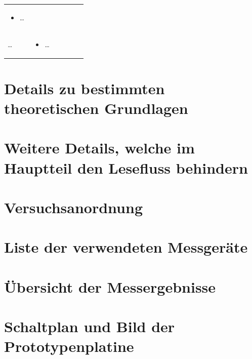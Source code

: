 \documentclass{scrbook} %
\begin{document}
\begin{table}[hbt]
\begin{tabular}{>{\raggedright\arraybackslash}p{0.3\linewidth} >{\raggedright\arraybackslash}p{0.65\linewidth}}
\begin{itemize}[noitemsep,topsep=0pt,partopsep=0pt,parsep=0pt]
                            \item \ldots
                            \end{itemize} \\ 
        \ldots    &    \vspace{-\topsep}
                    \begin{itemize}[noitemsep,topsep=0pt,partopsep=0pt,parsep=0pt] 
                    \item \ldots
                    \end{itemize} \\ 
        \hline 
    \end{tabular} 
\end{table}

\setcounter{chapter}{2}

\section{Details zu bestimmten theoretischen Grundlagen}

\section{Weitere Details, welche im Hauptteil den Lesefluss behindern}

\setcounter{chapter}{3}
\setcounter{section}{0}
\setcounter{table}{0}
\setcounter{figure}{0}

\section{Versuchsanordnung}

\section{Liste der verwendeten Messgeräte}

\section{Übersicht der Messergebnisse}

\section{Schaltplan und Bild der Prototypenplatine}

\setcounter{chapter}{4}
\setcounter{section}{0}
\setcounter{table}{0}
\setcounter{figure}{0}
\end{document}
